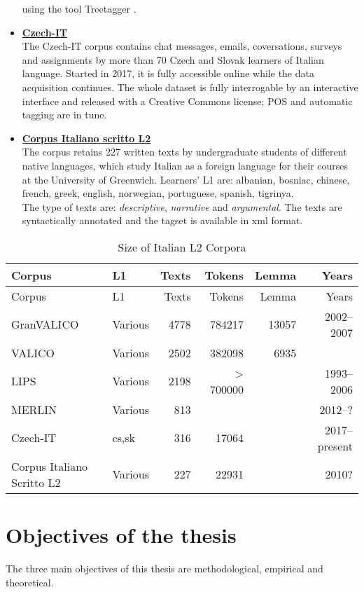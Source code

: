 \documentclass[a4paper,twoside,12pt,chapterprefix=false,bibliography=totocnumbered,listof=flat]{scrbook}
\begin{document}
\begin{itemize}
  using the tool Treetagger \citep{schmid1994}.
\item
  \textbf{\href{http://czech-it.github.io}{Czech-IT}} \citep{czech-it}\\
  The Czech-IT corpus contains chat messages, emails, coversations,
  surveys and assignments by more than 70 Czech and Slovak learners of
  Italian language. Started in 2017, it is fully accessible online while
  the data acquisition continues. The whole dataset is fully
  interrogable by an interactive interface and released with a Creative
  Commons license; POS and automatic tagging are in tune.
\item
  \textbf{\href{http://www.parlaritaliano.it/index.php/it/corpora-di-parlato/662-corpus-italiano-scritto-l2}{Corpus
  Italiano scritto L2}} \citep{vogheraturco2010}\\
  The corpus retains 227 written texts by undergraduate students of
  different native languages, which study Italian as a foreign language
  for their courses at the University of Greenwich. Learners' L1 are:
  albanian, bosniac, chinese, french, greek, english, norwegian,
  portuguese, spanish, tigrinya.\\
  The type of texts are: \emph{descriptive}, \emph{narrative} and
  \emph{argumental}. The texts are syntactically annotated and the
  tagset is available in xml format.
\end{itemize}

\begin{longtable}[]{@{}llrrrr@{}}
\caption{Size of Italian L2 Corpora}\tabularnewline
\toprule
Corpus & L1 & Texts & Tokens & Lemma & Years\tabularnewline
\midrule
\endfirsthead
\toprule
Corpus & L1 & Texts & Tokens & Lemma & Years\tabularnewline
\midrule
\endhead
GranVALICO & Various & 4778 & 784217 & 13057 & 2002--2007\tabularnewline
VALICO & Various & 2502 & 382098 & 6935 &\tabularnewline
LIPS & Various & 2198 & \textgreater{} 700000 & &
1993--2006\tabularnewline
MERLIN & Various & 813 & & & 2012--?\tabularnewline
Czech-IT & cs,sk & 316 & 17064 & & 2017--present\tabularnewline
Corpus Italiano Scritto L2 & Various & 227 & 22931 & &
2010?\tabularnewline
\bottomrule
\end{longtable}

\section{Objectives of the thesis}\label{objectives-of-the-thesis}

The three main objectives of this thesis are methodological, empirical
and theoretical.
\end{document}
